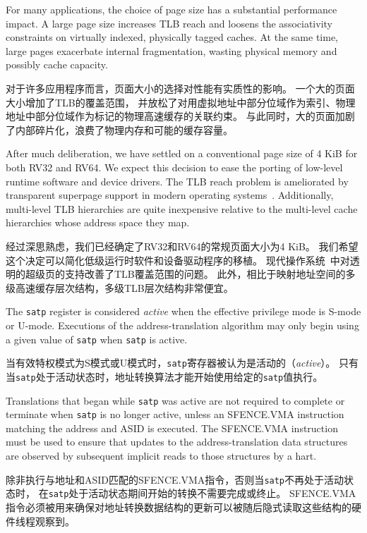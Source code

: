 \begin{commentary}
For many applications, the choice of page size has a substantial
performance impact.  A large page size increases TLB reach and loosens
the associativity constraints on virtually indexed, physically tagged
caches.  At the same time, large pages exacerbate internal
fragmentation, wasting physical memory and possibly cache capacity.

对于许多应用程序而言，页面大小的选择对性能有实质性的影响。
一个大的页面大小增加了TLB的覆盖范围，
并放松了对用虚拟地址中部分位域作为索引、物理地址中部分位域作为标记的物理高速缓存的关联约束。
与此同时，大的页面加剧了内部碎片化，浪费了物理内存和可能的缓存容量。

After much deliberation, we have settled on a conventional page size
of 4 KiB for both RV32 and RV64.  We expect this decision to ease the
porting of low-level runtime software and device drivers.  The TLB
reach problem is ameliorated by transparent superpage support in
modern operating systems~\cite{transparent-superpages}.  Additionally,
multi-level TLB hierarchies are quite inexpensive relative to the
multi-level cache hierarchies whose address space they map.

经过深思熟虑，我们已经确定了RV32和RV64的常规页面大小为4 KiB。
我们希望这个决定可以简化低级运行时软件和设备驱动程序的移植。
现代操作系统~\cite{transparent-superpages}中对透明的超级页的支持改善了TLB覆盖范围的问题。
此外，相比于映射地址空间的多级高速缓存层次结构，多级TLB层次结构非常便宜。
\end{commentary}
The {\tt satp} register is considered {\em active} when the effective
privilege mode is S-mode or U-mode.
Executions of the
address-translation algorithm may only begin using a given value of {\tt satp}
when {\tt satp} is active.

当有效特权模式为S模式或U模式时，{\tt satp}寄存器被认为是活动的（{\em active}）。
只有当{\tt satp}处于活动状态时，地址转换算法才能开始使用给定的{\tt satp}值执行。

\begin{commentary}
Translations that began while {\tt satp} was active are not required to
complete or terminate when {\tt satp} is no longer active, unless an
SFENCE.VMA instruction matching the address and ASID is executed.  The
SFENCE.VMA instruction must be used to ensure that updates to the
address-translation data structures are observed by subsequent implicit reads
to those structures by a hart.

除非执行与地址和ASID匹配的SFENCE.VMA指令，否则当{\tt satp}不再处于活动状态时，
在{\tt satp}处于活动状态期间开始的转换不需要完成或终止。
SFENCE.VMA指令必须被用来确保对地址转换数据结构的更新可以被随后隐式读取这些结构的硬件线程观察到。 
\end{commentary}


